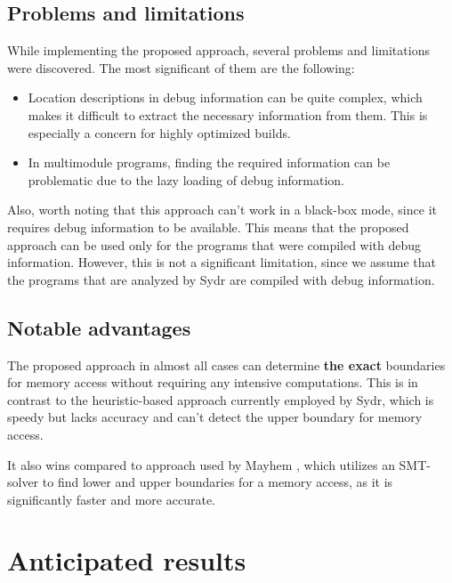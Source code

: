 \documentclass[conference]{IEEEtran}
\begin{document}
\subsection{Problems and limitations}

While implementing the proposed approach, several problems and limitations were discovered. The most significant of them are the following:

\begin{itemize}
    \item Location descriptions in debug information can be quite complex, which makes it difficult to extract the necessary information from them. This is especially a concern for highly optimized builds.
    \item In multimodule programs, finding the required information can be problematic due to the lazy loading of debug information.
\end{itemize}

Also, worth noting that this approach can't work in a black-box mode, since it requires debug information to be available. This means that the proposed approach can be used only for the programs that were compiled with debug information. However, this is not a significant limitation, since we assume that the programs that are analyzed by Sydr are compiled with debug information.

\subsection{Notable advantages}

The proposed approach in almost all cases can determine \textbf{the exact} boundaries for memory access without requiring any intensive computations. This is in contrast to the heuristic-based approach currently employed by Sydr, which is speedy but lacks accuracy and can't detect the upper boundary for memory access.

It also wins compared to approach used by Mayhem \cite{unleashing-mayhem-on-binary-code}, which utilizes an SMT-solver to find lower and upper boundaries for a memory access, as it is significantly faster and more accurate.


\section{Anticipated results}
\end{document}
